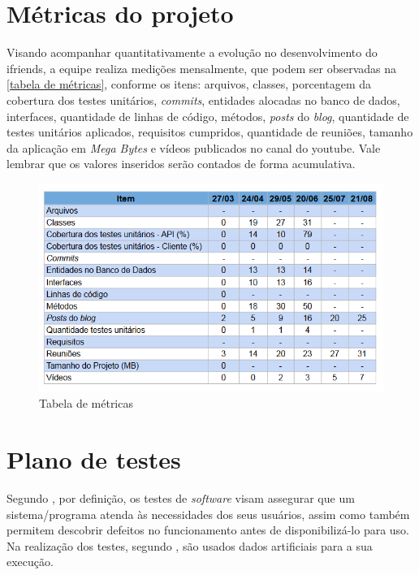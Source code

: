 \section{Métricas do projeto}
Visando acompanhar quantitativamente a evolução no desenvolvimento do \gls{ifriends}, a equipe realiza medições mensalmente, que podem ser observadas na \autoref{tabela de métricas}, conforme os itens: arquivos, classes, porcentagem da cobertura dos testes unitários, \textit{commits}, entidades alocadas no banco de dados, interfaces, quantidade de linhas de código, métodos, \textit{posts} do \textit{blog}, quantidade de testes unitários aplicados, requisitos cumpridos, quantidade de reuniões, tamanho da aplicação em \textit{Mega Bytes} e vídeos publicados no canal do \gls{youtube}. Vale lembrar que os valores inseridos serão contados de forma acumulativa. 

\begin{figure}[htb]
\centering
\caption{Tabela de métricas}
\label{tabela de métricas}
\includegraphics[width=1.0\textwidth]{anexos/Imagens_PesquisaAceitacao/Metricas.png}
\end{figure}
\FloatBarrier
\section{Plano de testes}
Segundo , por definição, os testes de \textit{software} visam assegurar que um sistema/programa atenda às necessidades dos seus usuários, assim como também permitem descobrir defeitos no funcionamento antes de disponibilizá-lo para uso. Na realização dos testes, segundo , são usados dados artificiais para a sua execução.

